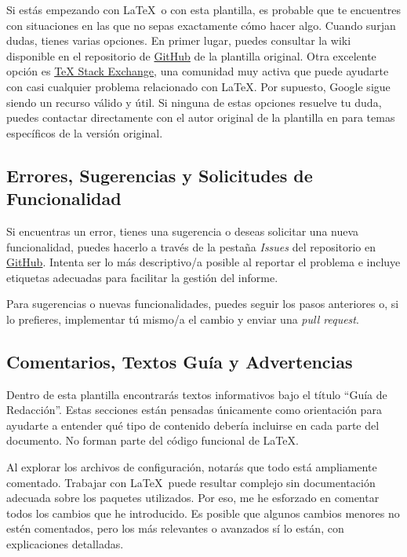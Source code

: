 {Si estás empezando con \LaTeX~o con esta plantilla, es probable que te encuentres con situaciones en las que no sepas exactamente cómo hacer algo. Cuando surjan dudas, tienes varias opciones. En primer lugar, puedes consultar la wiki disponible en el repositorio de \href{https://github.com/joseareia/ipleiria-thesis}{GitHub} de la plantilla original. Otra excelente opción es \href{https://tex.stackexchange.com/}{TeX Stack Exchange}, una comunidad muy activa que puede ayudarte con casi cualquier problema relacionado con \LaTeX. Por supuesto, Google sigue siendo un recurso válido y útil. Si ninguna de estas opciones resuelve tu duda, puedes contactar directamente con el autor original de la plantilla en \textit{\textcolor{blue}{}} para temas específicos de la versión original.

\subsection{Errores, Sugerencias y Solicitudes de Funcionalidad}

Si encuentras un error, tienes una sugerencia o deseas solicitar una nueva funcionalidad, puedes hacerlo a través de la pestaña \textit{Issues} del repositorio en \href{https://github.com/joseareia/ipleiria-thesis}{GitHub}. Intenta ser lo más descriptivo/a posible al reportar el problema e incluye etiquetas adecuadas para facilitar la gestión del informe.

Para sugerencias o nuevas funcionalidades, puedes seguir los pasos anteriores o, si lo prefieres, implementar tú mismo/a el cambio y enviar una \textit{pull request}. 

\subsection{Comentarios, Textos Guía y Advertencias}

Dentro de esta plantilla encontrarás textos informativos bajo el título ``Guía de Redacción''. Estas secciones están pensadas únicamente como orientación para ayudarte a entender qué tipo de contenido debería incluirse en cada parte del documento. No forman parte del código funcional de \LaTeX.

Al explorar los archivos de configuración, notarás que todo está ampliamente comentado. Trabajar con \LaTeX~puede resultar complejo sin documentación adecuada sobre los paquetes utilizados. Por eso, me he esforzado en comentar todos los cambios que he introducido. Es posible que algunos cambios menores no estén comentados, pero los más relevantes o avanzados sí lo están, con explicaciones detalladas.

}
